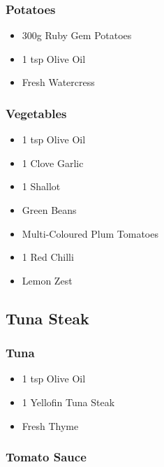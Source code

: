 \documentclass[11pt, english]{article}
\begin{document}
		\subsubsection*{Potatoes}

	\begin{itemize}
        \setlength\itemsep{0cm}
                \item 300g Ruby Gem Potatoes
		\item 1 tsp Olive Oil
		\item Fresh Watercress
        \end{itemize}

		\subsubsection*{Vegetables}

	\begin{itemize}
        \setlength\itemsep{0cm}
                \item 1 tsp Olive Oil
		\item 1 Clove Garlic
		\item 1 Shallot
		\item Green Beans
		\item Multi-Coloured Plum Tomatoes
		\item 1 Red Chilli
		\item Lemon Zest
        \end{itemize}

\newpage

	\subsection{Tuna Steak}

		\subsubsection*{Tuna}

	\begin{itemize}
        \setlength\itemsep{0cm}
                \item 1 tsp Olive Oil
		\item 1 Yellofin Tuna Steak
		\item Fresh Thyme
        \end{itemize}

		\subsubsection*{Tomato Sauce}
\end{document}
